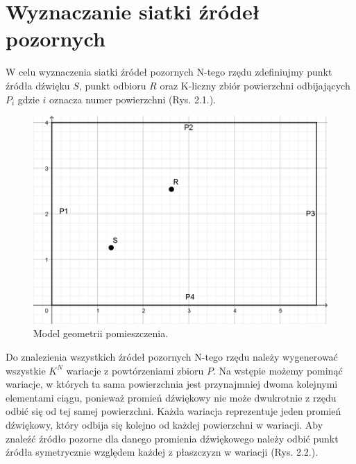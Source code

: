 
\section{Wyznaczanie siatki źródeł pozornych}\label{sec:szp}

W celu wyznaczenia siatki źródeł pozornych N-tego rzędu zdefiniujmy punkt źródła dźwięku $S$, punkt odbioru $R$ oraz K-liczny zbiór powierzchni odbijających $P_i$ gdzie $i$ oznacza numer powierzchni (Rys. 2.1.). 

\begin{figure}[h]
        \centering
                \centering
                \includegraphics[width=12cm]{rys1}
	\caption{Model geometrii pomieszczenia.}
\end{figure}

Do znalezienia wszystkich źródeł pozornych N-tego rzędu należy wygenerować wszystkie $K^N$ wariacje z powtórzeniami zbioru $P$. Na wstępie możemy pominąć wariacje, w których ta sama powierzchnia jest przynajmniej dwoma kolejnymi elementami ciągu, ponieważ promień dźwiękowy nie może dwukrotnie z rzędu odbić się od tej samej powierzchni. Każda wariacja reprezentuje jeden promień dźwiękowy, który odbija się kolejno od każdej powierzchni w wariacji. Aby znaleźć źródło pozorne dla danego promienia dźwiękowego należy odbić punkt źródła symetrycznie względem każdej z płaszczyzn w wariacji (Rys. 2.2.). 

